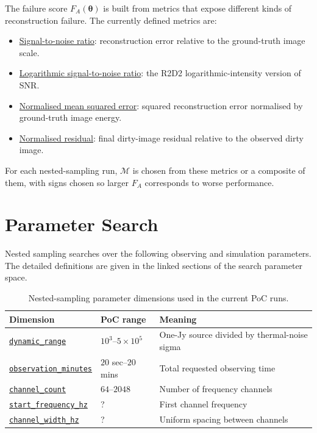 \documentclass[11pt]{article}
\begin{document}
The failure score $F_A(\boldsymbol\theta)$ is built from metrics that expose different kinds of reconstruction failure.
The currently defined metrics are:
\begin{itemize}
    \item \hyperref[sec:metric-snr]{Signal-to-noise ratio}: reconstruction error relative to the ground-truth image scale.
    \item \hyperref[sec:metric-log-snr]{Logarithmic signal-to-noise ratio}: the R2D2 logarithmic-intensity version of SNR.
    \item \hyperref[sec:metric-nmse]{Normalised mean squared error}: squared reconstruction error normalised by ground-truth image energy.
    \item \hyperref[sec:metric-normalised-residual]{Normalised residual}: final dirty-image residual relative to the observed dirty image.
\end{itemize}
For each nested-sampling run, $\mathcal M$ is chosen from these metrics or a composite of them, with signs chosen so larger $F_A$ corresponds to worse performance.

\section{Parameter Search}

Nested sampling searches over the following observing and simulation parameters.
The detailed definitions are given in the linked sections of the search parameter space.

\begin{table}[H]
\centering
\begin{tabular}{lll}
Dimension & PoC range & Meaning \\
\hline
\hyperref[sec:param-dynamic-range]{\texttt{dynamic\_range}} & $10^3$--$5\times10^5$ & One-Jy source divided by thermal-noise sigma \\
\hyperref[sec:param-observation-duration]{\texttt{observation\_minutes}} & $20$ sec--$20$ mins & Total requested observing time \\
\hyperref[sec:param-channel-count]{\texttt{channel\_count}} & $64$--$2048$ & Number of frequency channels \\
\hyperref[sec:param-frequency-range]{\texttt{start\_frequency\_hz}} & ? & First channel frequency \\
\hyperref[sec:param-frequency-range]{\texttt{channel\_width\_hz}} & ? & Uniform spacing between channels \\
\end{tabular}
\caption{Nested-sampling parameter dimensions used in the current PoC runs.}
\label{tab:nested-sampling-parameters}
\end{table}
\end{document}
